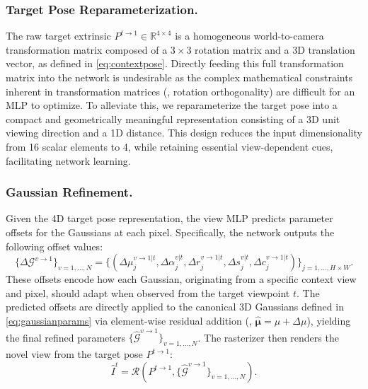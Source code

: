 \documentclass[runningheads]{llncs}
\begin{document}
\subsubsection{Target Pose Reparameterization.}
The raw target extrinsic $P^{t \to 1} \in \mathbb{R}^{4 \times 4}$ is a homogeneous world-to-camera transformation matrix composed of a $3 \times 3$ rotation matrix and a 3D translation vector, as defined in \cref{eq:contextpose}. Directly feeding this full transformation matrix into the network is undesirable as the complex mathematical constraints inherent in transformation matrices (\eg, rotation orthogonality) are difficult for an MLP to optimize. To alleviate this, we reparameterize the target pose into a compact and geometrically meaningful representation consisting of a 3D unit viewing direction and a 1D distance. This design reduces the input dimensionality from 16 scalar elements to 4, while retaining essential view-dependent cues, facilitating network learning.

\subsubsection{Gaussian Refinement.}
Given the 4D target pose representation, the view MLP predicts parameter offsets for the Gaussians at each pixel. Specifically, the network outputs the following offset values:
\begin{equation}
    \{\Delta \mathcal{G}^{v \to 1}\}_{v=1, \dots, N} = \{(\Delta \mu^{v \to 1 | t}_j, \Delta \alpha^{v | t}_j, \Delta r^{v \to 1 | t}_j, \Delta s^{v | t}_j, \Delta c^{v \to 1 | t}_j)\}_{j=1, \dots, H \times W}.
    \label{eq:offsetvalues}
\end{equation}
These offsets encode how each Gaussian, originating from a specific context view and pixel, should adapt when observed from the target viewpoint $t$. The predicted offsets are directly applied to the canonical 3D Gaussians defined in \cref{eq:gaussianparams} via element-wise residual addition (\eg, $\mathbf{\hat{\mu}} = \mu + \Delta \mu$), yielding the final refined parameters $\{\hat{\mathcal{G}}^{v \to 1} \}_{v=1, \dots, N}$. The rasterizer then renders the novel view from the target pose $P^{t \to 1}$:
\begin{equation}
    \hat{I}^t = \mathcal{R}(P^{t \to 1}, \{\hat{\mathcal{G}}^{v \to 1} \}_{v=1, \dots, N}).
    \label{eq:rendering}
\end{equation}
\end{document}
